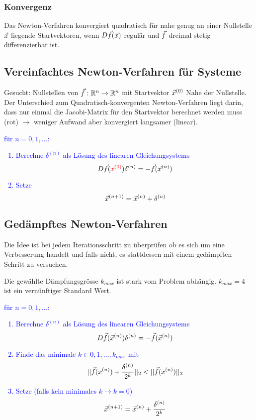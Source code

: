 \subsubsection{Konvergenz}

Das Newton-Verfahren konvergiert quadratisch für nahe genug an einer Nullstelle
$\vec x$ liegende Startvektoren, wenn $D\vec f(\vec x)$ regulär und $\vec f$ dreimal
stetig differenzierbar ist.







\subsection{Vereinfachtes Newton-Verfahren für Systeme}

Gesucht: Nullstellen von $\vec f : \mathbb{R}^n \to \mathbb{R}^n$ mit Startvektor $\vec x^{(0)}$
Nahe der Nullstelle.\\

Der Unterschied zum Quadratisch-konvergenten Newton-Verfahren liegt darin, dass
nur einmal die Jacobi-Matrix für den Startvektor berechnet werden muss (rot)
$\rightarrow$ weniger Aufwand aber konvergiert langsamer (linear).

\textcolor{blue}{
	\Large{
		für $n = 0, 1,...$:
		\begin{enumerate}
			\item Berechne $\delta^{(n)}$ als Lösung des linearen Gleichungsystems
			      $$ D\vec{f}( \textcolor{red}{ \vec x^{(0)} } ) \delta^{(n)} = - \vec f(\vec x^{(n)}) $$
			\item Setze
			      $$ \vec x^{(n+1)} = \vec x^{(n)} + \delta^{(n)} $$
		\end{enumerate}
	}
}



\subsection{Gedämpftes Newton-Verfahren}

Die Idee ist bei jedem Iterationsschritt zu überprüfen ob es sich um eine
Verbesserung handelt und falls nicht, es stattdessen mit einem gedämpften Schritt
zu versuchen.

Die gewählte Dämpfungsgrösse $k_{max}$ ist stark vom Problem abhängig.
\textcolor{PineGreen}{$k_{max} = 4$ ist ein vernünftiger Standard Wert.}


\textcolor{blue}{
	\Large{
		für $n = 0, 1,...$:
		\begin{enumerate}
			\item Berechne $\delta^{(n)}$ als Lösung des linearen Gleichungsystems
			      $$ D\vec{f}(\vec x^{(n)}) \delta^{(n)} = - \vec f(\vec x^{(n)}) $$
			\item Finde das minimale $k \in {0,1,...,k_{max}}$ mit
			      $$ || \vec f(x^{(n)}) + \frac{\delta^{(n)}}{2^k} ||_2
				      < || \vec f(x^{(n)}) ||_2  $$
			\item Setze (falls kein minimales $k \rightarrow k = 0$)
			      $$ \vec x^{(n+1)} = \vec x^{(n)} + \frac{ \delta^{(n)} }{ 2^{k} } $$
		\end{enumerate}
	}
}

